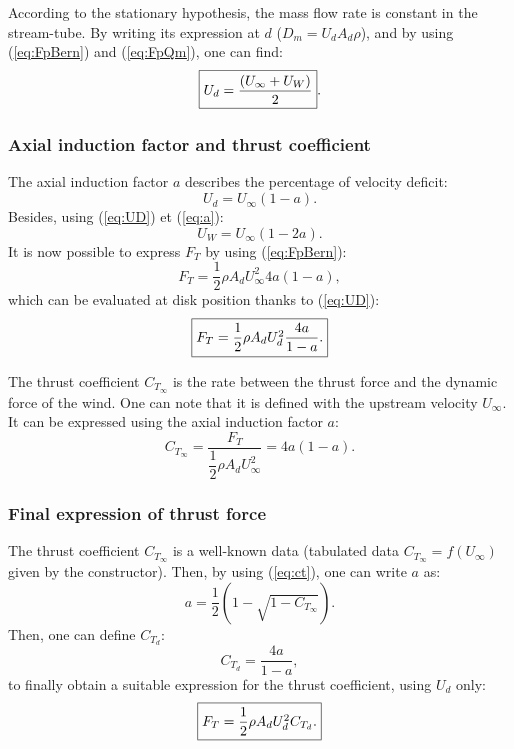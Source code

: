 \bigbreak
According to the stationary hypothesis, the mass flow rate is constant in the stream-tube. By writing its expression at $d$ ($D_m = U_d A_d \rho$), and by using (\ref{eq:FpBern}) and (\ref{eq:FpQm}), one can find:
\begin{equation}
\fbox{$	
U_d = \dfrac{(U_\infty +  U_W)}{2} 
\label{eq:UD}
$}.
\end{equation}

		\subsubsection*{Axial induction factor and thrust coefficient}			
				\label{p:BEMQMFacIndAx}
The axial induction factor $a$ describes the percentage of velocity deficit:
\begin{equation}
U_d = U_\infty( 1 - a ).
\label{eq:a}
\end{equation}
Besides, using (\ref{eq:UD}) et (\ref{eq:a}):
\begin{equation}	
\label{eq:BEMUw}
U_W = U_\infty( 1 - 2a ).				
\end{equation}			
It is now possible to express $F_T$ by using (\ref{eq:FpBern}): 
\begin{equation}	
\label{eq:Fpinf}	
F_T = \dfrac{1}{2} \rho A_d U_\infty^2 4 a (1-a),
\end{equation}
which can be evaluated at disk position thanks to (\ref{eq:UD}): 	
\begin{equation}	
\label{eq:FpD}	
\fbox{$
F_T = \dfrac{1}{2} \rho A_d U_d^2 \dfrac{4a}{1-a}.
$}			
\end{equation}

\medbreak			
The thrust coefficient $C_{T_\infty}$ is the rate between the thrust force and the dynamic force of the wind. One can note that it is defined with the upstream velocity $U_\infty$. It can be expressed using the axial induction factor $a$:
\begin{equation}	
\label{eq:ct}	
C_{T_\infty} = \dfrac{F_T}{\dfrac{1}{2} \rho A_d U_\infty^2} = 4 a (1 -a).
\end{equation}	

		\subsubsection*{Final expression of thrust force}

The thrust coefficient $C_{T_\infty}$  is a well-known data (tabulated data $C_{T_\infty} = f(U_{\infty})$ given by the constructor). Then, by using  (\ref{eq:ct}), one can write $a$ as:
\begin{equation}
a = \dfrac{1}{2}(1-\sqrt{1-C_{T_\infty}}).
\end{equation}
Then, one can define $C_{T_d}$:
\begin{equation}	
C_{T_d} = \dfrac{4a}{1 -a},
\end{equation}	
to finally obtain a suitable expression for the thrust coefficient, using $U_d$ only:
\begin{equation}
\fbox{$
F_T = \dfrac{1}{2} \rho A_d U_d^2 C_{T_d}.
$}		
\label{eq:finadnr}
\end{equation}  


